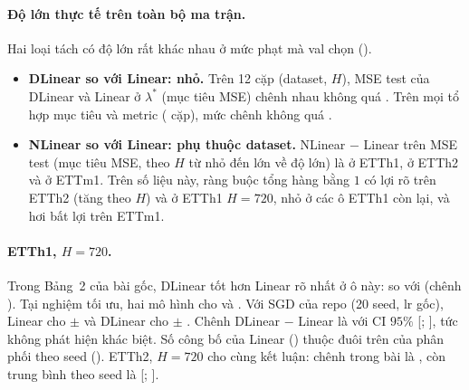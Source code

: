 \paragraph{Độ lớn thực tế trên toàn bộ ma trận.} Hai loại tách có độ lớn rất khác nhau ở mức phạt mà val chọn ().
\begin{itemize}
    \item \textbf{DLinear so với Linear: nhỏ.} Trên 12 cặp (dataset, $H$), MSE test của DLinear và Linear ở $\lambda^*$ (mục tiêu MSE) chênh nhau không quá \nmBThreeDLinMinusLinAbsMax. Trên mọi tổ hợp mục tiêu và metric (\nmBThreeDLinMinusLinAllCount{} cặp), mức chênh không quá \nmBThreeDLinMinusLinAllAbsMax.
    \item \textbf{NLinear so với Linear: phụ thuộc dataset.} NLinear $-$ Linear trên MSE test (mục tiêu MSE, theo $H$ từ nhỏ đến lớn về độ lớn) là \nmBThreeNLinMinusLinETThOneRange{} ở ETTh1, \nmBThreeNLinMinusLinETThTwoRange{} ở ETTh2 và \nmBThreeNLinMinusLinETTmOneRange{} ở ETTm1. Trên số liệu này, ràng buộc tổng hàng bằng $1$ có lợi rõ trên ETTh2 (tăng theo $H$) và ở ETTh1 $H = 720$, nhỏ ở các ô ETTh1 còn lại, và hơi bất lợi trên ETTm1.
\end{itemize}

\paragraph{ETTh1, $H = 720$.} Trong Bảng~2 của bài gốc, DLinear tốt hơn Linear rõ nhất ở ô này: \nmBOneETThOneHSevenTwoZeroDLinearPub{} so với \nmBOneETThOneHSevenTwoZeroLinearPub{} (chênh \nmCThreeETThOneHSevenTwoZeroPubD). Tại nghiệm tối ưu, hai mô hình cho \nmBThreeETThOneHSevenTwoZeroDLinearMSEMse{} và \nmBThreeETThOneHSevenTwoZeroLinearMSEMse. Với SGD của repo (20 seed, lr gốc), Linear cho \nmBOneETThOneHSevenTwoZeroLinearMean{} $\pm$ \nmBOneETThOneHSevenTwoZeroLinearSd{} và DLinear cho \nmBOneETThOneHSevenTwoZeroDLinearMean{} $\pm$ \nmBOneETThOneHSevenTwoZeroDLinearSd. Chênh DLinear $-$ Linear là \nmCThreeETThOneHSevenTwoZeroDTest{} với CI $95\%$ [\nmCThreeETThOneHSevenTwoZeroDTestLo; \nmCThreeETThOneHSevenTwoZeroDTestHi], tức không phát hiện khác biệt. Số công bố của Linear (\nmBOneETThOneHSevenTwoZeroLinearPub) thuộc đuôi trên của phân phối theo seed (). ETTh2, $H = 720$ cho cùng kết luận: chênh trong bài là \nmCThreeETThTwoHSevenTwoZeroPubD, còn trung bình theo seed là \nmCThreeETThTwoHSevenTwoZeroDTest{} [\nmCThreeETThTwoHSevenTwoZeroDTestLo; \nmCThreeETThTwoHSevenTwoZeroDTestHi].

